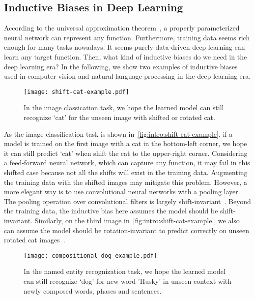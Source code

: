 \subsection{Inductive Biases in Deep Learning}
\label{ssec:intro:bias-source}
According to the universal approximation
theorem~\citep{hornik1989multilayer}, a properly parameterized neural
network can represent any function. Furthermore, training data seems
rich enough for many tasks nowadays. It seems purely data-driven deep
learning can learn any target function. Then, what kind of inductive
biases do we need in the deep learning era? In the following, we show two
examples of inductive biases used in computer vision and natural
language processing in the deep learning era.

\begin{figure}[!th]
  \centering
  \texttt{[image: shift-cat-example.pdf]}
  \caption{\label{fig:intro:shift-cat-example}In the image classication
    task, we hope the learned model can still recognize `cat' for the
    unseen image with shifted or rotated cat.}
\end{figure}

 As the image classification task is shown
in~\autoref{fig:intro:shift-cat-example}, if a model is trained on the
first image with a cat in the bottom-left corner, we hope it can still
predict `cat' when shift the cat to the upper-right corner.
Considering a feed-forward neural network, which can capture any
function, it may fail in this shifted case because not all the
shifts will exist in the training data. Augmenting the training data
with the shifted images may mitigate this problem. However, a more
elegant way is to use convolutional neural networks with a pooling
layer. The pooling operation over convolutional filters is largely
shift-invariant~\citep{zhang2019making}. Beyond the training data, the
inductive bias here assumes the model should be shift-invariant.
Similarly, on the third image
in~\autoref{fig:intro:shift-cat-example}, we also can assume the model
should be rotation-invariant to predict correctly on unseen rotated
cat images~\citep{cheng2016rifd}.

\begin{figure}[!th]
  \centering
  \texttt{[image: compositional-dog-example.pdf]}
  \caption{\label{fig:intro:compositional-dog-example}In the named entity
    recognization task, we hope the learned model can still recognize
    `dog' for new word 'Husky' in unseen context with newly composed
    words, phases and sentences.}
\end{figure}

